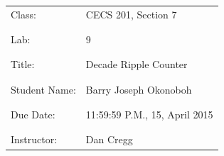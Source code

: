 \documentclass[9pt]{article}
\begin{document}
\vspace*{\fill}
\begin{center}
{\Huge \begin{tabular}{@{}ll@{}}
   Class: & CECS 201, Section 7 \\ \\ \\
   Lab: & 9 \\ \\ \\
   Title: & Decade Ripple Counter \\ \\ \\
   Student Name: & Barry Joseph Okonoboh \\ \\ \\
   Due Date: & 11:59:59 P.M., 15, April 2015 \\ \\ \\
   Instructor: & Dan Cregg
\end{tabular}}
\end{center}
\vspace*{\fill}
\newpage
\end{document}
